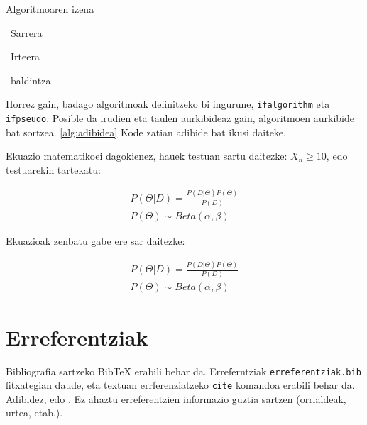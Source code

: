 \begin{ifalgorithm}[t]
	\begin{ifpseudo}{Algoritmoaren izena}
	\item	\In\ Sarrera
	\item	\Out\ Irteera
	\item	{}
	\item	{}
	\item	\EFor
	\item	\If\ baldintza \Then
	\item	{}
	\item	{}
	\item	\T{\Done}
	\item	\Else
	\item	\T{\Do}
	\item	{}
	\item	{}
	\item	\TT{\EFor}
	\item	{}
	\item	\EIf
	\item	{}
	\item	{}
	\item	\TT{\Return}
	\item	\T{\EIf}
	\end{ifpseudo}
	\caption{Sasikodearen adibidea}\label{alg:adibidea}
\end{ifalgorithm}


Horrez gain, badago algoritmoak definitzeko bi ingurune, \texttt{ifalgorithm} eta \texttt{ifpseudo}. Posible da irudien eta taulen aurkibideaz gain, algoritmoen aurkibide bat sortzea. \ref{alg:adibidea} Kode zatian adibide bat ikusi daiteke.

Ekuazio matematikoei dagokienez, hauek testuan sartu daitezke: $X_n \geq 10$, edo testuarekin tartekatu:

\begin{eqnarray}
P(\Theta|D) = \frac{P(D|\Theta)P(\Theta)}{P(D)}\\
P(\Theta) \sim Beta(\alpha, \beta)
\end{eqnarray} 

Ekuazioak zenbatu gabe ere sar daitezke:

\begin{eqnarray*}
P(\Theta|D) = \frac{P(D|\Theta)P(\Theta)}{P(D)}\\
P(\Theta) \sim Beta(\alpha, \beta)
\end{eqnarray*} 

\section{Erreferentziak}

Bibliografia sartzeko BibTeX erabili behar da. Erreferntziak \texttt{erreferentziak.bib} fitxategian daude, eta textuan errferenziatzeko \texttt{cite} komandoa erabili behar da. Adibidez, \cite{Shahbaba2011} edo \cite{Efron1994, Rmanual, Subramanian2005gene}. Ez ahaztu erreferentzien informazio guztia sartzen (orrialdeak, urtea, etab.).

